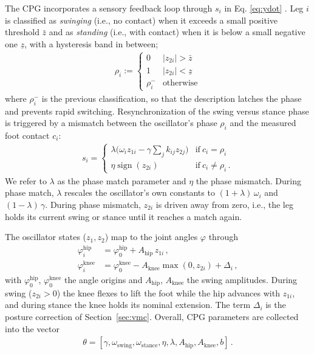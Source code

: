 \documentclass[lettersize,journal]{IEEEtran}
\begin{document}
The CPG incorporates a sensory feedback loop through $s_i$ in Eq. \ref{eq:ydot} \cite{righetti2008pattern}. Leg $i$ is classified as \emph{swinging} (i.e., no contact) when it exceeds a small positive threshold $\bar{z}$ and as \emph{standing} (i.e., with contact) when it is below a small negative one $\underline{z}$, with a hysteresis band in between;
\begin{align}
		\rho_i := \begin{cases}
		0 & |z_{2i}| > \bar{z} \\
		1 & |z_{2i}| < \underline{z} \\
		\rho_i^{-} & \text{otherwise}
	\end{cases}
  \label{eq:phase-classify}
\end{align}
where $\rho_i^{-}$ is the previous classification, so that the description latches the phase and prevents rapid switching. Resynchronization of the swing versus stance phase is triggered by a mismatch between the oscillator's phase $\rho_i$ and the measured foot contact $c_i$:
\begin{align}
s_i = \begin{cases} 
		\lambda \big( \omega_i z_{1i} - \gamma \textstyle\sum_{j} k_{ij} z_{2j} \big) & \text{if}\  c_i = \rho_i \\
	 	\eta \operatorname{sign}(z_{2i}) & \text{if}\ c_i \neq \rho_i \, . 
	\end{cases}
  \label{eq:feedback}
\end{align}
We refer to $\lambda$ as the phase match parameter and $\eta$ the phase mismatch. During phase match, $\lambda$ rescales the oscillator's own constants to $(1+\lambda)\,\omega_i$ and $(1-\lambda)\,\gamma$. During phase mismatch, $z_{2i}$ is driven away from zero, i.e., the leg holds its current swing or stance until it reaches a match again.

The oscillator states ($z_1,z_2$) map to the joint angles $\varphi$ through
\begin{align}
  \varphi^{\text{hip}}_i &=  \varphi^{\text{hip}}_0  +  A_{\text{hip}}\, z_{1i} \,, \label{eq:joint-map-hip} \\
  \varphi^{\text{knee}}_i &= \varphi^{\text{knee}}_0  -  A_{\text{knee}} \max( 0, z_{2i})  +  \Delta_i \,,
  \label{eq:joint-map}
\end{align}
with $\varphi^{\text{hip}}_0$, $\varphi^{\text{knee}}_0$ the angle origins and $A_{\text{hip}}$, $A_{\text{knee}}$ the swing amplitudes.
During swing ($z_{2i} > 0$) the knee flexes to lift the foot while the hip advances with $z_{1i}$, and during stance the knee holds its nominal extension.
The term $\Delta_i$ is the posture correction of Section~\ref{sec:vmc}.
%
Overall, CPG parameters are collected into the vector
\begin{align}
    \theta = [\gamma, \omega_{\text{swing}}, \omega_{\text{stance}}, \eta, \lambda, A_{\text{hip}}, A_{\text{knee}}, b] \, .
    \label{eq:cpg-parameters}
\end{align}
\end{document}
